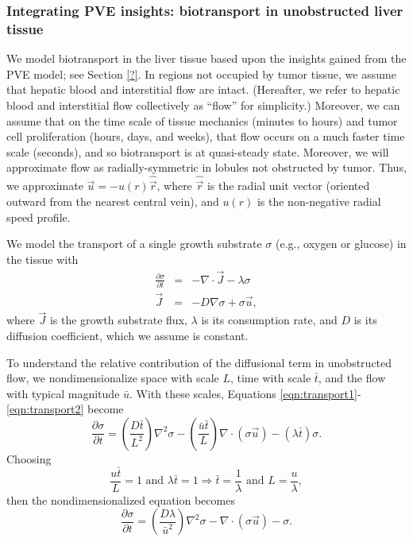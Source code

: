 \documentclass[smallextended,natbib]{svjour3}
\newcommand{\beqa}{\begin{eqnarray}}
\newcommand{\beq}{\begin{equation}}
\newcommand{\eeqa}{\end{eqnarray}}
\newcommand{\eeq}{\end{equation}}
\newcommand{\hatvec}[1]{\hat{\vec{#1}}}
\begin{document}
\subsubsection{Integrating PVE insights: biotransport in unobstructed liver tissue}
We model biotransport in the liver tissue based upon the 
insights gained from the PVE model; see Section \ref{?}. In 
regions not occupied by tumor tissue, we assume that hepatic blood 
and interstitial flow are intact. (Hereafter, we 
refer to hepatic blood and interstitial flow collectively 
as ``flow'' for simplicity.) Moreover, we can assume that 
on the time scale of tissue mechanics (minutes to hours) and 
tumor cell proliferation (hours, days, and weeks), that flow occurs 
on a much faster time scale (seconds), and so biotransport is at quasi-steady 
state. Moreover, we will approximate flow as radially-symmetric in lobules not 
obstructed by tumor. Thus, we approximate $\vec{u} = - u(r) \hatvec{r}$, 
where $\hatvec{r}$ is the radial unit vector (oriented outward from the nearest
central vein), and $u(r)$ is the non-negative radial speed profile. 

We model the transport of a single growth substrate $\sigma$ 
(e.g., oxygen or glucose) in the tissue with 
\beqa
\frac{ \partial \sigma }{\partial t} & = & 
-\nabla \cdot \vec{J} - \lambda \sigma \label{eqn:transport1}  \\
\vec{J} &  = & -D \nabla \sigma + \sigma \vec{u} \label{eqn:transport2} , 
\eeqa
where $\vec{J}$ is the growth substrate flux, $\lambda$ is its 
consumption rate, and $D$ is its diffusion coefficient, which 
we assume is constant. 

To understand the relative contribution of the diffusional 
term in unobstructed flow, we nondimensionalize space with scale $L$, time 
with scale $\bar{t}$, and the flow with typical magnitude  
$\bar{u}$. With these scales, 
Equations \ref{eqn:transport1}-\ref{eqn:transport2} 
become 
\beq
\frac{ \partial  \sigma}{\partial t}  =  
\left( \frac{ D \bar t}{ L^2 } \right) \nabla^2 \sigma  
- \left(  \frac{\bar{u} \bar{t} }{L} \right)
\nabla \cdot \left( \sigma \vec{u} \right) 
 - \left( \lambda \bar{t} \right) \sigma. 
\eeq
Choosing 
\beq
\frac{ u \bar{t}}{L } = 1 \textrm{ and } \lambda \bar{t} = 1 
\Longrightarrow \bar{t} = \frac{1}{\lambda} \textrm{ and } 
L = \frac{ u }{ \lambda }, 
\eeq
then the nondimensionalized equation becomes 
\beq
\frac{ \partial  \sigma}{\partial t}  =  
\left( \frac{ D \lambda }{ \bar{u}^2 } \right) \nabla^2 \sigma  
- \nabla \cdot \left( \sigma \vec{u} \right) - \sigma . 
\eeq
\end{document}
